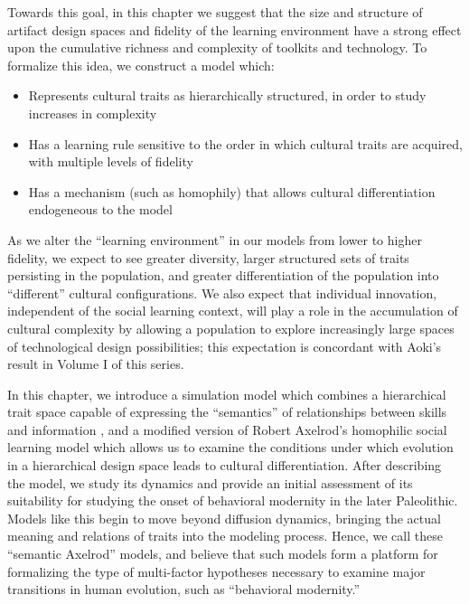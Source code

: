 \documentclass[graybox,natbib]{svmult}
\begin{document}
Towards this goal, in this chapter we suggest that the size and
structure of artifact design spaces and fidelity of the learning
environment have a strong effect upon the cumulative richness and
complexity of toolkits and technology. To formalize this idea, we
construct a model which:

\begin{itemize}
\itemsep1pt\parskip0pt
\item
  Represents cultural traits as hierarchically structured, in order to
  study increases in complexity
\item
  Has a learning rule sensitive to the order in which cultural traits
  are acquired, with multiple levels of fidelity
\item
  Has a mechanism (such as homophily) that allows cultural
  differentiation endogeneous to the model
\end{itemize}

As we alter the ``learning environment'' in our models from lower to
higher fidelity, we expect to see greater diversity, larger structured
sets of traits persisting in the population, and greater differentiation
of the population into ``different'' cultural configurations. We also
expect that individual innovation, independent of the social learning
context, will play a role in the accumulation of cultural complexity by
allowing a population to explore increasingly large spaces of
technological design possibilities; this expectation is concordant with
Aoki's \citeyearpar{Aoki2013Determinants-of} result in Volume I of this
series.

In this chapter, we introduce a simulation model which combines a
hierarchical trait space capable of expressing the ``semantics'' of
relationships between skills and information \citep{Mesoudi2008a}, and a
modified version of Robert Axelrod's \citeyearpar{axelrod1997}
homophilic social learning model which allows us to examine the
conditions under which evolution in a hierarchical design space leads to
cultural differentiation. After describing the model, we study its
dynamics and provide an initial assessment of its suitability for
studying the onset of behavioral modernity in the later Paleolithic.
Models like this begin to move beyond diffusion dynamics, bringing the
actual meaning and relations of traits into the modeling process. Hence,
we call these ``semantic Axelrod'' models, and believe that such models
form a platform for formalizing the type of multi-factor hypotheses
necessary to examine major transitions in human evolution, such as
``behavioral modernity.''
\end{document}
